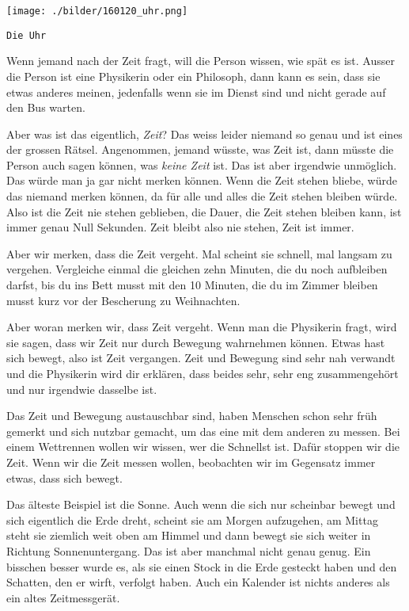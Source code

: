 \thispagestyle{empty}
\begin{center}
\texttt{[image: ./bilder/160120\_uhr.png]}
\end{center}
\vskip 2cm
{\Huge\color{farbe}\hfill{\tt{Die Uhr}}}
\newpage
\lettrine[lines=2, lhang=.2, loversize=.25, lraise=0.05, findent=0.1em, nindent=0em]{W}{}enn jemand nach der Zeit fragt, will die Person wissen,
wie spät es ist. Ausser die Person ist eine Physikerin oder ein Philosoph, dann
kann es sein, dass sie etwas anderes meinen, jedenfalls wenn sie im Dienst sind
und nicht gerade auf den Bus warten.

Aber was ist das eigentlich, \textit{Zeit}? Das weiss leider niemand so genau
und ist eines der grossen Rätsel. Angenommen, jemand wüsste, was Zeit ist, dann
müsste die Person auch sagen können, was \textit{keine Zeit} ist. Das ist aber
irgendwie unmöglich. Das würde man ja gar nicht merken können. Wenn die Zeit
stehen bliebe, würde das niemand merken können, da für alle und alles die Zeit
stehen bleiben würde. Also ist die Zeit nie stehen geblieben, die Dauer, die
Zeit stehen bleiben kann, ist immer genau Null Sekunden. Zeit bleibt also nie
stehen, Zeit ist immer.

Aber wir merken, dass die Zeit vergeht. Mal scheint sie schnell, mal langsam zu
vergehen. Vergleiche einmal die gleichen zehn Minuten, die du noch aufbleiben
darfst, bis du ins Bett musst mit den 10 Minuten, die du im Zimmer bleiben
musst kurz vor der Bescherung zu Weihnachten.

Aber woran merken wir, dass Zeit vergeht. Wenn man die Physikerin fragt, wird
sie sagen, dass wir Zeit nur durch Bewegung wahrnehmen können. Etwas hast sich
bewegt, also ist Zeit vergangen. Zeit und Bewegung sind sehr nah verwandt und
die Physikerin wird dir erklären, dass beides sehr, sehr eng zusammengehört und
nur irgendwie dasselbe ist.

Das Zeit und Bewegung austauschbar sind, haben Menschen schon sehr früh gemerkt
und sich nutzbar gemacht, um das eine mit dem anderen zu messen. Bei einem
Wettrennen wollen wir wissen, wer die Schnellst ist. Dafür stoppen wir die
Zeit. Wenn wir die Zeit messen wollen, beobachten wir im Gegensatz immer etwas,
dass sich bewegt.

Das älteste Beispiel ist die Sonne. Auch wenn die sich nur scheinbar bewegt und
sich eigentlich die Erde dreht, scheint sie am Morgen aufzugehen, am Mittag
steht sie ziemlich weit oben am Himmel und dann bewegt sie sich weiter in
Richtung Sonnenuntergang. Das ist aber manchmal nicht genau genug. Ein bisschen
besser wurde es, als sie einen Stock in die Erde gesteckt haben und den
Schatten, den er wirft, verfolgt haben. Auch ein Kalender ist nichts anderes
als ein altes Zeitmessgerät.

